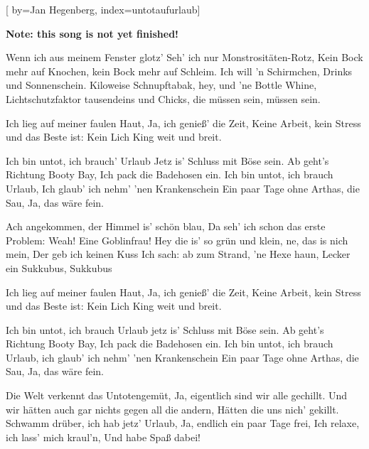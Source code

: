 
[%
    by={Jan Hegenberg},
    index={untotaufurlaub}]


    \label{untotaufurlaub}

    \textbf{Note: this song is not yet finished!}

    \beginverse
        Wenn ich aus meinem Fenster glotz'
        Seh' ich nur Monstrosit\"{a}ten-Rotz,
        Kein Bock mehr auf Knochen, kein Bock mehr auf Schleim.
        Ich will 'n Schirmchen, Drinks und Sonnenschein.
        Kiloweise Schnupftabak, hey, und 'ne Bottle Whine,
        Lichtschutzfaktor tausendeins und Chicks, die m\"{u}ssen sein, m\"{u}ssen sein.
    \endverse

    \beginverse*
        Ich lieg auf meiner faulen Haut,
        Ja, ich genie\ss{}' die Zeit,
        Keine Arbeit, kein Stress und das Beste ist:
        Kein Lich King weit und breit.
    \endverse

    \beginchorus
        Ich bin untot, ich brauch' Urlaub
        Jetz is' Schluss mit B\"{o}se sein.
        Ab geht's Richtung Booty Bay,
        Ich pack die Badehosen ein.
        Ich bin untot, ich brauch Urlaub,
        Ich glaub' ich nehm' 'nen Krankenschein
        Ein paar Tage ohne Arthas, die Sau,
        Ja, das w\"{a}re fein.
    \endchorus

    \beginverse
        Ach angekommen, der Himmel is' sch\"{o}n blau,
        Da seh' ich schon das erste Problem:
        Weah! Eine Goblinfrau!
        Hey die is' so gr\"{u}n und klein, ne, das is nich mein,
        Der geb ich keinen Kuss
        Ich sach: ab zum Strand, 'ne Hexe haun,
        Lecker ein Sukkubus, Sukkubus
    \endverse

    \beginverse*
        Ich lieg auf meiner faulen Haut,
        Ja, ich genie\ss{}' die Zeit,
        Keine Arbeit, kein Stress und das Beste ist:
        Kein Lich King weit und breit.
    \endverse

    \beginchorus
        Ich bin untot, ich brauch Urlaub
        jetz is' Schluss mit B\"{o}se sein.
        Ab geht's Richtung Booty Bay,
        Ich pack die Badehosen ein.
        Ich bin untot, ich brauch Urlaub,
        ich glaub' ich nehm' 'nen Krankenschein
        Ein paar Tage ohne Arthas, die Sau,
        Ja, das w\"{a}re fein.
    \endchorus

    \beginverse*
        Die Welt verkennt das Untotengem\"{u}t,
        Ja, eigentlich sind wir alle gechillt.
        Und wir h\"{a}tten auch gar nichts gegen all die andern,
        H\"{a}tten die uns nich' gekillt.
        Schwamm dr\"{u}ber, ich hab jetz' Urlaub,
        Ja, endlich ein paar Tage frei,
        Ich relaxe, ich lass' mich kraul'n,
        Und habe Spa\ss{} dabei!
    \endverse

